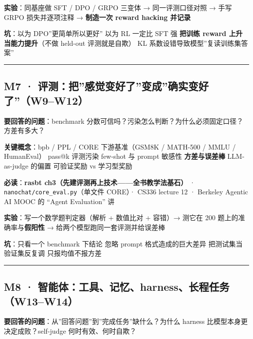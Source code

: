 \documentclass[
  chinese,
  11pt,
]{ctexart}
\begin{document}
\textbf{实验}：同基座做 SFT / DPO / GRPO 三变体 → 同一评测口径对照 → 手写 GRPO 损失并逐项注释 → \textbf{制造一次 reward hacking 并记录}

\textbf{坑}：以为 DPO''更简单所以更好''\textbar{} 以为 RL 一定比 SFT 强 \textbar{} \textbf{把训练 reward 上升当能力提升}（不做 held-out 评测就是自欺）\textbar{} KL 系数设错导致模型''复读训练集答案''

\begin{center}\rule{0.5\linewidth}{0.5pt}\end{center}

\subsection{M7 · 评测：把''感觉变好了''变成''确实变好了''（W9--W12）}\label{m7-ux8bc4ux6d4bux628aux611fux89c9ux53d8ux597dux4e86ux53d8ux6210ux786eux5b9eux53d8ux597dux4e86w9w12}

\textbf{要回答的问题}：benchmark 分数可信吗？污染怎么判断？为什么必须固定口径？方差有多大？

\textbf{关键概念}：bpb / PPL / CORE \textbar{} 下游基准（GSM8K / MATH-500 / MMLU / HumanEval）\textbar{} pass@k \textbar{} 评测污染 \textbar{} few-shot 与 prompt 敏感性 \textbar{} \textbf{方差与误差棒} \textbar{} LLM-as-judge 的偏置 \textbar{} 可验证奖励 vs 学习型奖励

\textbf{必读}：\textbf{rasbt ch3（先建评测再上技术------全书教学法基石）} · \texttt{nanochat/core\_eval.py}（单文件 CORE）· CS336 lecture 12 · Berkeley Agentic AI MOOC 的 ``Agent Evaluation'' 讲

\textbf{实验}：写一个数学题判定器（解析 + 数值比对 + 容错）→ 测它在 200 题上的准确率与\textbf{假阳性} → 给两个模型跑同一套评测并给误差棒

\textbf{坑}：只看一个 benchmark 下结论 \textbar{} 忽略 prompt 格式造成的巨大差异 \textbar{} 把测试集当验证集反复调 \textbar{} 只报均值不报方差

\begin{center}\rule{0.5\linewidth}{0.5pt}\end{center}

\subsection{M8 · 智能体：工具、记忆、harness、长程任务（W13--W14）}\label{m8-ux667aux80fdux4f53ux5de5ux5177ux8bb0ux5fc6harnessux957fux7a0bux4efbux52a1w13w14}

\textbf{要回答的问题}：从''回答问题''到''完成任务''缺什么？为什么 harness 比模型本身更决定成败？self-judge 何时有效、何时自欺？
\end{document}

